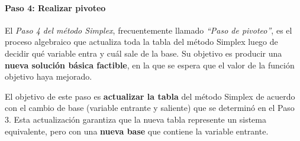 \paragraph{Paso 4: Realizar pivoteo}

El \textit{Paso 4 del método Simplex}, frecuentemente llamado
\textit{``Paso de pivoteo''}, es el proceso algebraico que actualiza toda la
tabla del método Simplex luego de decidir qué variable entra y cuál sale de la
base. Su objetivo es producir una \textbf{nueva solución básica factible}, en
la que se espera que el valor de la función objetivo haya mejorado.

El objetivo de este paso es \textbf{actualizar la tabla} del método Simplex de
acuerdo con el cambio de base (variable entrante y saliente) que se determinó
en el Paso 3. Esta actualización garantiza que la nueva tabla represente un
sistema equivalente, pero con una \textbf{nueva base} que contiene la variable
entrante.

